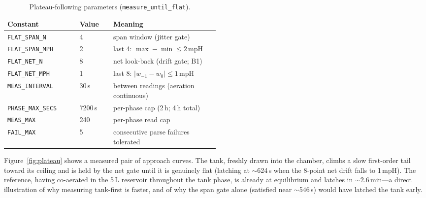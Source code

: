 \documentclass[11pt]{article}
\begin{document}
\begin{table}[t]
\centering
\caption{Plateau-following parameters (\texttt{measure\_until\_flat}).}
\label{tab:plateau}
\footnotesize
\begin{tabular}{@{}llp{0.5\linewidth}@{}}
\toprule
Constant & Value & Meaning \\
\midrule
\texttt{FLAT\_SPAN\_N}  & 4 & span window (jitter gate) \\
\texttt{FLAT\_SPAN\_MPH}& 2 & last 4: $\max-\min\le 2$\,mpH \\
\texttt{FLAT\_NET\_N}   & 8 & net look-back (drift gate; B1) \\
\texttt{FLAT\_NET\_MPH} & 1 & last 8: $|w_{-1}-w_0|\le 1$\,mpH \\
\texttt{MEAS\_INTERVAL} & 30\,s & between readings (aeration continuous) \\
\texttt{PHASE\_MAX\_SECS}& 7200\,s & per-phase cap (2\,h; 4\,h total) \\
\texttt{MEAS\_MAX}      & 240 & per-phase read cap \\
\texttt{FAIL\_MAX}      & 5 & consecutive parse failures tolerated \\
\bottomrule
\end{tabular}
\end{table}

Figure~\ref{fig:plateau} shows a measured pair of approach curves. The tank,
freshly drawn into the chamber, climbs a slow first-order tail toward its
ceiling and is held by the net gate until it is genuinely flat (latching at
$\sim$624\,s when the 8-point net drift falls to 1\,mpH). The reference, having
co-aerated in the 5\,L reservoir throughout the tank phase, is already at
equilibrium and latches in $\sim$2.6\,min---a direct illustration of why
measuring tank-first is faster, and of why the span gate alone (satisfied near
$\sim$546\,s) would have latched the tank early.
\end{document}
